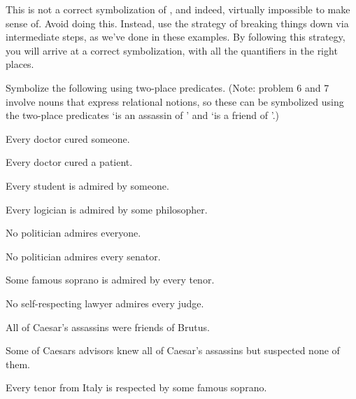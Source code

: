 This is not a correct symbolization of , and indeed, virtually impossible to make sense of.  Avoid doing this.  Instead, use the strategy of breaking things down via intermediate steps, as we've done in these examples.  By following this strategy, you will arrive at a correct symbolization, with all the quantifiers in the right places.

\practiceproblems

\problempart Symbolize the following using two-place predicates.  (Note: problem 6 and 7 involve nouns that express relational notions, so these can be symbolized using the two-place predicates `\blank is an assassin of \blank' and `\blank is a friend of \blank'.)

\begin{earg}

\item Every doctor cured someone.

\item Every doctor cured a patient.

\item Every student is admired by someone.

\item Every logician is admired by some philosopher.

\item No politician admires everyone.

\item No  politician admires every senator.

\item Some famous soprano is admired by every tenor.  

\item No self-respecting lawyer admires every judge.

\item All of Caesar's assassins were friends of Brutus.

\item Some of Caesars advisors knew all of Caesar's assassins but suspected none of them.

\item Every tenor from Italy is respected by some famous soprano.


\end{earg}



